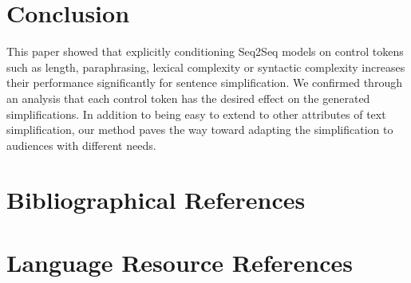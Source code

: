 \documentclass[10pt, a4paper]{article}
\begin{document}
\section{Conclusion}
This paper showed that explicitly conditioning Seq2Seq models on control tokens such as length, paraphrasing, lexical complexity or syntactic complexity increases their performance significantly for sentence simplification. We confirmed through an analysis that each control token has the desired effect on the generated simplifications.
In addition to being easy to extend to other attributes of text simplification, our method paves the way toward adapting the simplification to audiences with different needs. 

\section{Bibliographical References}
\label{main:ref}



\section{Language Resource References}
\label{lr:ref}
\end{document}
